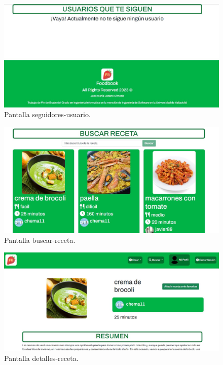 \begin{figure}
  \centering
  \includegraphics[scale=0.30]{img/ma-seguidores-usuario.JPG}
  \caption{Pantalla seguidores-usuario.}
  \label{fig:ma-seguidores-usuario}
\end{figure}




\begin{figure}
  \centering
  \includegraphics[scale=0.30]{img/ma-buscar-receta.JPG}
  \caption{Pantalla buscar-receta.}
  \label{fig:ma-buscar-receta}
\end{figure}

\begin{figure}
  \centering
  \includegraphics[scale=0.30]{img/ma-detalles-receta.JPG}
  \caption{Pantalla detalles-receta.}
  \label{fig:ma-detalles-receta}
\end{figure}

